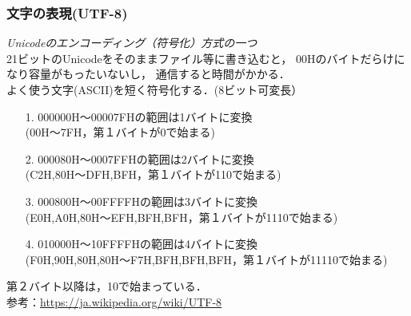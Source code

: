 \documentclass[handout]{beamer}        %
\begin{document}
\begin{frame}
  \frametitle{文字の表現(UTF-8)}
  \emph{Unicodeのエンコーディング（符号化）方式の一つ}\\
  21ビットのUnicodeをそのままファイル等に書き込むと，
  00Hのバイトだらけになり容量がもったいないし，
  通信すると時間がかかる． \\
  よく使う文字(ASCII)を短く符号化する．(8ビット可変長）
  \begin{enumerate}
    \item[1.] 000000H〜00007FHの範囲は1バイトに変換 \\
              (00H〜7FH，第１バイトが0で始まる)
    \item[2.] 000080H〜0007FFHの範囲は2バイトに変換  \\
              (C2H,80H〜DFH,BFH，第１バイトが110で始まる)
    \item[3.] 000800H〜00FFFFHの範囲は3バイトに変換 \\
              (E0H,A0H,80H〜EFH,BFH,BFH，第１バイトが1110で始まる)
    \item[4.] 010000H〜10FFFFHの範囲は4バイトに変換 \\
              (F0H,90H,80H,80H〜F7H,BFH,BFH,BFH，第１バイトが11110で始まる)
  \end{enumerate}
  第２バイト以降は，10で始まっている．\\
  参考：\url{https://ja.wikipedia.org/wiki/UTF-8}
\end{frame}
\end{document}
